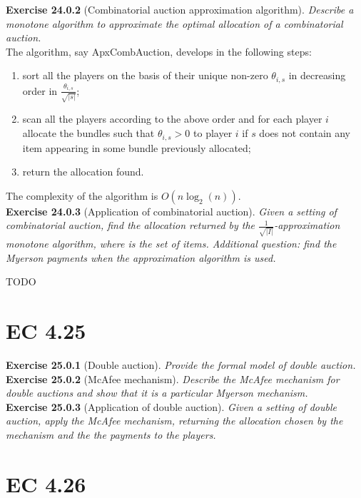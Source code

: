 \textbf{Exercise 24.0.2} (Combinatorial auction approximation algorithm). \textit{Describe a monotone algorithm to approximate the optimal allocation of a combinatorial auction.}\\

The algorithm, say ApxCombAuction, develops in the following steps:
\begin{enumerate}
\item sort all the players on the basis of their unique non-zero $\theta_{i,s}$ in decreasing order in $\frac{\theta_{i,s}}{\sqrt{|s|}}$;
\item scan all the players according to the above order and for each player $i$ allocate the bundles such that $\theta_{i,s} >0$ to player $i$ if $s$ does not contain any item appearing in some bundle previously allocated;
\item return the allocation found.
\end{enumerate}
The complexity of the algorithm is $O(n \log_2 (n))$.\\

\textbf{Exercise 24.0.3} (Application of combinatorial auction). \textit{Given a setting of combinatorial auction, find the allocation returned by the $\frac{1}{\sqrt{|I|}}$-approximation monotone algorithm, where is the set of items. Additional question: find the Myerson payments when the approximation algorithm is used.}

TODO\\

\section{EC 4.25}

\textbf{Exercise 25.0.1} (Double auction). \textit{Provide the formal model of double auction.}\\

\textbf{Exercise 25.0.2} (McAfee mechanism). \textit{Describe the McAfee mechanism for double auctions and show that it is a particular Myerson mechanism.}\\

\textbf{Exercise 25.0.3} (Application of double auction). \textit{Given a setting of double auction, apply the McAfee mechanism, returning the allocation chosen by the mechanism and the the payments to the players.}

\section{EC 4.26}

